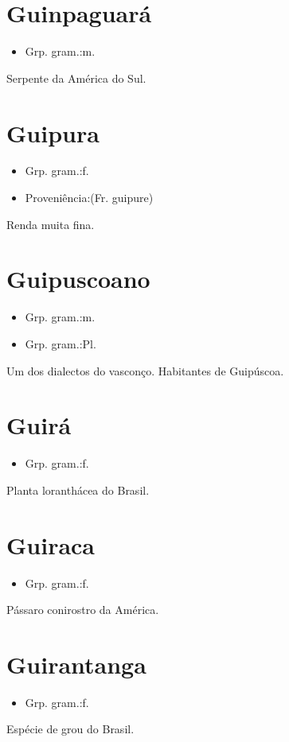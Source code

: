 \section{Guinpaguará}
\begin{itemize}
\item {Grp. gram.:m.}
\end{itemize}
Serpente da América do Sul.
\section{Guipura}
\begin{itemize}
\item {Grp. gram.:f.}
\end{itemize}
\begin{itemize}
\item {Proveniência:(Fr. \textunderscore guipure\textunderscore )}
\end{itemize}
Renda muita fina.
\section{Guipuscoano}
\begin{itemize}
\item {Grp. gram.:m.}
\end{itemize}
\begin{itemize}
\item {Grp. gram.:Pl.}
\end{itemize}
Um dos dialectos do vasconço.
Habitantes de Guipúscoa.
\section{Guirá}
\begin{itemize}
\item {Grp. gram.:f.}
\end{itemize}
Planta loranthácea do Brasil.
\section{Guiraca}
\begin{itemize}
\item {Grp. gram.:f.}
\end{itemize}
Pássaro conirostro da América.
\section{Guirantanga}
\begin{itemize}
\item {Grp. gram.:f.}
\end{itemize}
Espécie de grou do Brasil.
